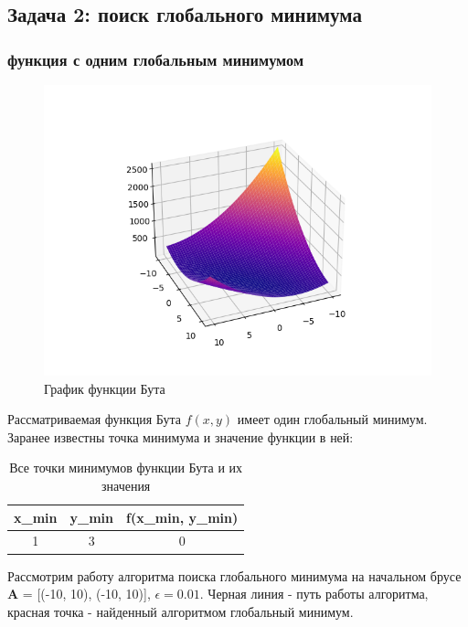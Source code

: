 \subsection{Задача 2: поиск глобального минимума}

\subsubsection{функция с одним глобальным минимумом}

\begin{figure}[H]
		\centering
			\includegraphics{task2/resources/Figure_1.png}
		\caption{График функции Бута}
		\label{w_pert}
	\end{figure}

Рассматриваемая функция Бута $f(x, y)$ имеет один глобальный минимум. Заранее известны точка минимума и значение функции в ней:

\begin{table}[H]
	\centering
	\begin{tabular}{| c | c | c |}
		\hline
		    x_{min} & y_{min} & f(x_{min}, y_{min}) \\
		\hline
		    1 & 3 & 0 \\
   		\hline
	\end{tabular}
	\caption{Все точки минимумов функции Бута и их значения}
\end{table}

Рассмотрим работу алгоритма поиска глобального минимума на начальном брусе \textbf{A} = [(-10, 10), (-10, 10)], $\epsilon = 0.01$. Черная линия - путь работы алгоритма, красная точка - найденный алгоритмом глобальный минимум.

